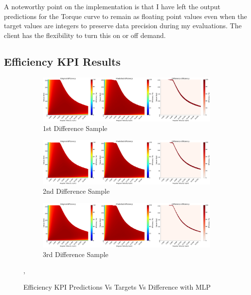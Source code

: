 \documentclass{report} %
\begin{document}
A noteworthy point on the implementation is that I have left the output predictions for the Torque curve to remain as floating point values even when the target values 
are integers to preserve data precision during my evaluations. The client has the flexibility to turn this on or off demand. 

\subsection{Efficiency KPI Results}\label{subsec:Efficiency KPI Results with MLP Efficiency KPI Regularization}

\begin{figure}[H]
    \centering
    \begin{subfigure}{1\textwidth}
        \centering
        \includegraphics[width=1\textwidth]{./ReportImages/evalkpi3dprediction1.png} 
        \caption{1st Difference Sample} 
        \label{fig:1st Difference Sample}
    \end{subfigure}\hfill
    \begin{subfigure}{1\textwidth}
        \centering
        \includegraphics[width=1\textwidth]{./ReportImages/evalkpi3dprediction2.png} 
        \caption{2nd Difference Sample} 
        \label{fig:2nd Difference Sample}
    \end{subfigure}\hfill
    \begin{subfigure}{1\textwidth}
        \centering
        \includegraphics[width=1\textwidth]{./ReportImages/evalkpi3dprediction3.png} 
        \caption{3rd Difference Sample} 
        \label{fig:3rd Difference Sample}
    \end{subfigure}
    \caption{Efficiency \ac{KPI} Predictions Vs Targets Vs Difference with \ac{MLP}},
    \label{fig:Efficiency KPI Predictions Vs Targets Vs Difference with MLP}
\end{figure} 
\end{document}
